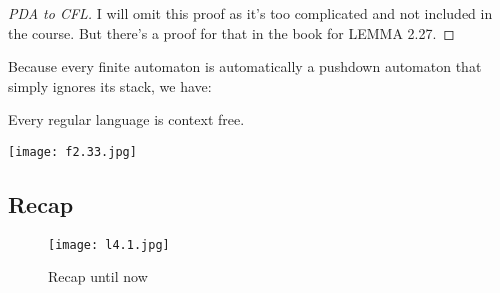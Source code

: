 \begin{proof}[PDA to CFL]
    I will omit this proof as it's too complicated and not included in the course. But there's a proof for that in the book for LEMMA 2.27.
\end{proof}

Because every finite automaton is automatically a pushdown automaton that simply ignores its stack, we have:

\begin{corollary}
    Every regular language is context free.

    \centering 
    \texttt{[image: f2.33.jpg]}
\end{corollary}


\subsection{Recap}

\begin{figure}[h]
    \centering
    \texttt{[image: l4.1.jpg]}
    \caption{Recap until now}
\end{figure}